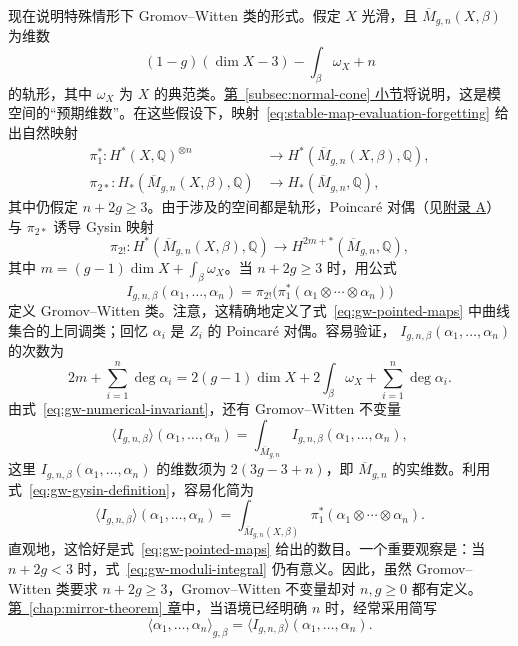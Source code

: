 现在说明特殊情形下 Gromov--Witten 类的形式。假定 $X$ 光滑，且 $\overline M_{g,n}(X,\beta)$ 为维数
\begin{equation}\label{eq:stable-map-expected-dimension}
(1-g)(\dim X-3)-\int_\beta\omega_X+n
\end{equation}
的轨形，其中 $\omega_X$ 为 $X$ 的典范类。\hyperref[subsec:normal-cone]{第~\ref*{subsec:normal-cone} 小节}将说明，这是模空间的“预期维数”。在这些假设下，映射~\eqref{eq:stable-map-evaluation-forgetting} 给出自然映射
\[
\begin{aligned}
\pi_1^*:H^*(X,\mathbb Q)^{\otimes n}
&\longrightarrow H^*(\overline M_{g,n}(X,\beta),\mathbb Q),\\
\pi_{2*}:H_*(\overline M_{g,n}(X,\beta),\mathbb Q)
&\longrightarrow H_*(\overline M_{g,n},\mathbb Q),
\end{aligned}
\]
其中仍假定 $n+2g\geq3$。由于涉及的空间都是轨形，Poincaré 对偶（见\hyperref[app:singular-varieties]{附录 A}）与 $\pi_{2*}$ 诱导 Gysin 映射
\[
\pi_{2!}:H^*(\overline M_{g,n}(X,\beta),\mathbb Q)
\longrightarrow H^{2m+*}(\overline M_{g,n},\mathbb Q),
\]
其中 $m=(g-1)\dim X+\int_\beta\omega_X$。当 $n+2g\geq3$ 时，用公式
\begin{equation}\label{eq:gw-gysin-definition}
I_{g,n,\beta}(\alpha_1,\ldots,\alpha_n)
=\pi_{2!}\bigl(\pi_1^*(\alpha_1\otimes\cdots\otimes\alpha_n)\bigr)
\end{equation}
定义 Gromov--Witten 类。注意，这精确地定义了式~\eqref{eq:gw-pointed-maps} 中曲线集合的上同调类；回忆 $\alpha_i$ 是 $Z_i$ 的 Poincaré 对偶。容易验证，
$I_{g,n,\beta}(\alpha_1,\ldots,\alpha_n)$ 的次数为
\[
2m+\sum_{i=1}^n\deg\alpha_i
=2(g-1)\dim X+2\int_\beta\omega_X+\sum_{i=1}^n\deg\alpha_i.
\]
由式~\eqref{eq:gw-numerical-invariant}，还有 Gromov--Witten 不变量
\[
\langle I_{g,n,\beta}\rangle(\alpha_1,\ldots,\alpha_n)
=\int_{\overline M_{g,n}}I_{g,n,\beta}(\alpha_1,\ldots,\alpha_n),
\]
这里 $I_{g,n,\beta}(\alpha_1,\ldots,\alpha_n)$ 的维数须为 $2(3g-3+n)$，即 $\overline M_{g,n}$ 的实维数。利用式~\eqref{eq:gw-gysin-definition}，容易化简为
\begin{equation}\label{eq:gw-moduli-integral}
\langle I_{g,n,\beta}\rangle(\alpha_1,\ldots,\alpha_n)
=\int_{\overline M_{g,n}(X,\beta)}
\pi_1^*(\alpha_1\otimes\cdots\otimes\alpha_n).
\end{equation}
直观地，这恰好是式~\eqref{eq:gw-pointed-maps} 给出的数目。一个重要观察是：当 $n+2g<3$ 时，式~\eqref{eq:gw-moduli-integral} 仍有意义。因此，虽然 Gromov--Witten 类要求 $n+2g\geq3$，Gromov--Witten 不变量却对 $n,g\geq0$ 都有定义。\hyperref[chap:mirror-theorem]{第~\ref*{chap:mirror-theorem} 章}中，当语境已经明确 $n$ 时，经常采用简写
\[
\langle\alpha_1,\ldots,\alpha_n\rangle_{g,\beta}
=\langle I_{g,n,\beta}\rangle(\alpha_1,\ldots,\alpha_n).
\]


